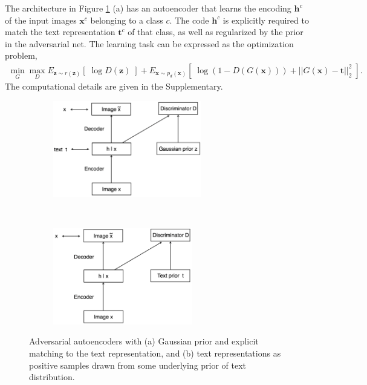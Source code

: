 \documentclass{article}
\newcommand{\bb}[1]{\boldsymbol{#1}}
\begin{document}
	The architecture in Figure \ref{fig:Architecture} (a) has an autoencoder that learns the encoding $\bb{h}^c$ of the input images $\bb{x}^c$ belonging to a class $c$. The code $\bb{h}^c$ is explicitly required to match the text representation $\bb{t}^c$ of that class, as well as regularized by the prior in the adversarial net. The learning task can be expressed as the optimization problem,
	\begin{align}
		\min_{G} \max_D E_{\bb{z} \sim r(\bb{z})}\left[\; \log D(\bb{z}) \;\right] + E_{\bb{x} \sim p_d(\bb{x})}\left[\; \log( 1 - D(G(\bb{x})) ) + || G(\bb{x}) - \bb{t} ||_2^2 \;\right].
	\end{align}
	The computational details are given in the Supplementary.




\begin{figure}[t!]
    \centering
    \begin{subfigure}[t]{0.5\textwidth}
        \centering
        \includegraphics[height=1.65in]{figNoisePrior}
        \caption{}
    \end{subfigure}%
    ~ 
    \begin{subfigure}[t]{0.5\textwidth}
        \centering
        \includegraphics[height=1.65in]{figTextPrior}
        \caption{}
    \end{subfigure}
    \caption{Adversarial autoencoders with (a) Gaussian prior and explicit matching to the text representation, and (b) text representations as positive samples drawn from some underlying prior of text distribution.}
    \label{fig:Architecture}
\end{figure}
\end{document}
